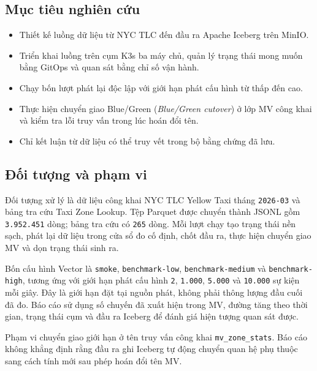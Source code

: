 \subsection{Mục tiêu nghiên cứu}
\begin{itemize}
\item Thiết kế luồng dữ liệu từ NYC TLC đến đầu ra Apache Iceberg trên MinIO.
\item Triển khai luồng trên cụm K3s ba máy chủ, quản lý trạng thái mong muốn bằng GitOps và quan sát bằng chỉ số vận hành.
\item Chạy bốn lượt phát lại độc lập với giới hạn phát cấu hình từ thấp đến cao.
\item Thực hiện chuyển giao Blue/Green (\emph{Blue/Green cutover}) ở lớp MV công khai và kiểm tra lỗi truy vấn trong lúc hoán đổi tên.
\item Chỉ kết luận từ dữ liệu có thể truy vết trong bộ bằng chứng đã lưu.
\end{itemize}

\subsection{Đối tượng và phạm vi}
Đối tượng xử lý là dữ liệu công khai NYC TLC Yellow Taxi tháng \texttt{2026-03} và bảng tra cứu Taxi Zone Lookup. Tệp Parquet được chuyển thành JSONL gồm \texttt{3.952.451} dòng; bảng tra cứu có \texttt{265} dòng. Mỗi lượt chạy tạo trạng thái nền sạch, phát lại dữ liệu trong cửa sổ đo cố định, chốt đầu ra, thực hiện chuyển giao MV và dọn trạng thái sinh ra.

Bốn cấu hình Vector là \texttt{smoke}, \texttt{benchmark-low}, \texttt{benchmark-medium} và \texttt{benchmark-high}, tương ứng với giới hạn phát cấu hình \texttt{2}, \texttt{1.000}, \texttt{5.000} và \texttt{10.000} sự kiện mỗi giây. Đây là giới hạn đặt tại nguồn phát, không phải thông lượng đầu cuối đã đo. Báo cáo sử dụng số chuyến đã xuất hiện trong MV, đường tăng theo thời gian, trạng thái cụm và đầu ra Iceberg để đánh giá hiện tượng quan sát được.

Phạm vi chuyển giao giới hạn ở tên truy vấn công khai \texttt{mv\_zone\_stats}. Báo cáo không khẳng định rằng đầu ra ghi Iceberg tự động chuyển quan hệ phụ thuộc sang cách tính mới sau phép hoán đổi tên MV.


